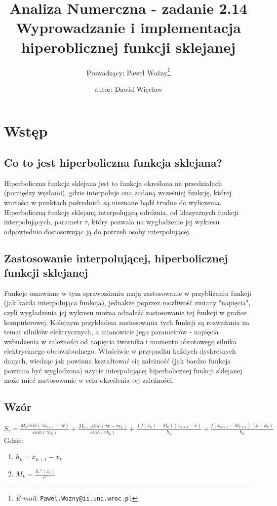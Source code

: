\documentclass{article}
\title{\centering \Large Analiza Numerczna - zadanie 2.14 \\
\large Wyprowadzanie i implementacja hiperoblicznej funkcji sklejanej}
\author{\Large Prowadzący: Paweł Woźny\thanks{\textit{E-mail}: \texttt{Pawel.Wozny@ii.uni.wroc.pl}}%
	    \and \Large autor: Dawid Więcław}
\begin{document}
\maketitle
\thispagestyle{empty}
\setcounter{page}{1}
\section{Wstęp}
\subsection{Co to jest hiperboliczna funkcja sklejana?}
\large
\hspace{3mm} Hiperboliczna funkcja sklejana jest to funkcja określona na przedziałach (pomiędzy węzłami), gdzie interpoluje ona zadaną wcześniej funkcję, której wartości w punktach pośrednich są nieznane bądź trudne do wyliczenia. Hiperboliczną funkcję sklejaną interpolującą odróżnia, od klasycznych funkcji interpolujących, parametr $\tau$, który pozwala na wygładzenie jej wykresu odpowiednio dostosowując ją do potrzeb osoby interpolującej.

\subsection{Zastosowanie interpolującej, hiperbolicznej funkcji sklejanej}
\hspace{3mm} Funkcje omawiane w tym sprawozdaniu mają zastosowanie w przybliżaniu funkcji (jak każda interpolująca funkcja), jednakże poprzez możliwość zmiany "napięcia", czyli wygładzenia jej wykresu można odnaleźć zastosowanie tej funkcji w grafice komputerowej.
Kolejnym przykładem zastosowania tych funkcji są rozważania na temat silników elektrycznych, a mianowicie jego parametrów - napięcia wzbudzenia w zależności od napięcia twornika i momentu obrotowego silnika elektrycznego obcowzbudnego. Właściwie w przypadku każdych dyskretnych danych, wiedząc jak powinna kształtować się zależność (jak bardzo funkcja powinna być wygładzona) użycie interpolującej hiperbolicznej funkcji sklejanej może mieć zastosowanie w celu określenia tej zależności.
\subsection{Wzór}
$S_{\tau}=\frac{M_{k}sinh(\tau x_{k+1}-\tau x)}{sinh(\tau h_{k})} + \frac{M_{k+1}sinh(\tau x - \tau x_{k})}{sinh(\tau h_{k})} + \frac{(f(x_{k})-M_{k})(x_{k+1}-x)}{h_{k}} + \frac{f(x_{k+1}-M_{k+1})(x-x_{k})}{h_{k}}$
\newline
\newline
Gdzie:
\begin{enumerate}
\item $h_{k}=x_{k+1}-x_{k}$
\item $M_{k}=\frac{S_{\tau}''(x_{i})}{r^{2}}$
\end{enumerate}
\end{document}
